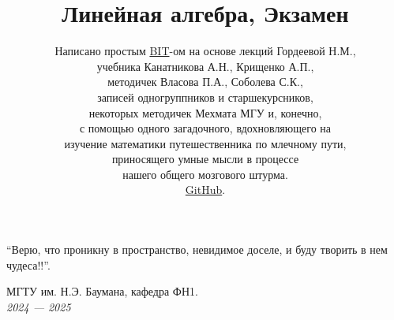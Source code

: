 \documentclass[a4papper]{article}
\title{\Huge Линейная алгебра, Экзамен}
\author{
    Написано простым \href{https://t.me/Borislav_Timoshin}{BIT}-ом на основе лекций Гордеевой Н.М., \\ 
    учебника Канатникова А.Н., Крищенко А.П., \\
    методичек Власова П.А., Соболева С.К., \\
    записей одногруппников и старшекурсников,\\ некоторых методичек Мехмата МГУ и, конечно, \\ с помощью одного загадочного, вдохновляющего на \\ изучение математики путешественника по млечному пути, \\
    приносящего умные мысли в процессе \\
    нашего общего мозгового штурма. \\
    \href{https://github.com/BorislavTimoshin/Linear-Algebra-BMSTU-BS1-Exam-}{GitHub}.
}
\date{} %
\begin{document}
    \pagestyle{fancy}
    \fancyhead[L]{\thepage}

    \maketitle

    \epigraph{
        ``Верю, что проникну в пространство, невидимое доселе, и буду творить в нем чудеса!!''.
    }{}


    \vfill %

    \begin{center}
        \Large МГТУ им. Н.Э. Баумана, кафедра ФН1. \\
        \emph{2024 — 2025}
    \end{center}

    \newpage
        
    \tableofcontents

    
    
\end{document}
